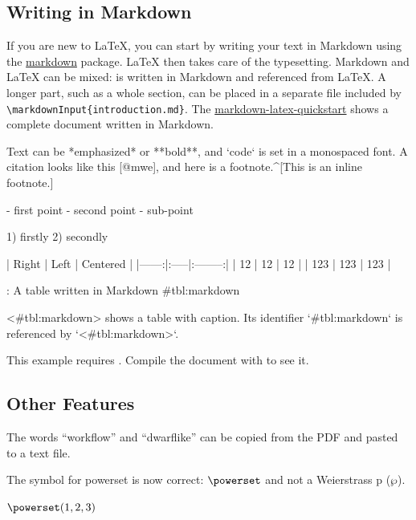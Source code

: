 \subsection{Writing in Markdown}\label{sec:markdown}

\ifluatex
  If you are new to \LaTeX{}, you can start by writing your text in Markdown using the \href{https://ctan.org/pkg/markdown}{markdown} package.
  \LaTeX{} then takes care of the typesetting.
  Markdown and \LaTeX{} can be mixed:
   is written in Markdown and referenced from \LaTeX{}.
  A longer part, such as a whole section, can be placed in a separate file included by \verb|\markdownInput{introduction.md}|.
  The \href{https://github.com/latextemplates/markdown-latex-quickstart}{markdown-latex-quickstart} shows a complete document written in Markdown.

  \begin{ltgexample}
  \begin{markdown}
Text can be *emphasized* or **bold**, and `code` is set in a monospaced font.
A citation looks like this [@mwe], and here is a footnote.^[This is an inline footnote.]

- first point
- second point
  - sub-point

1) firstly
2) secondly

| Right | Left | Centered |
|------:|:-----|:--------:|
|    12 | 12   |    12    |
|   123 | 123  |   123    |

: A table written in Markdown {#tbl:markdown}

<#tbl:markdown> shows a table with caption.
Its identifier `{#tbl:markdown}` is referenced by `<#tbl:markdown>`.
\end{markdown}
  \end{ltgexample}
\else
  This example requires .
  Compile the document with  to see it.
\fi

\subsection{Other Features}

\begin{ltgexample}
The words \enquote{workflow} and \enquote{dwarflike} can be copied from the PDF and pasted to a text file.
\end{ltgexample}

\begin{ltgexample}
The symbol for powerset is now correct: $\powerset$ and not a Weierstrass p ($\wp$).

$\powerset({1,2,3})$
\end{ltgexample}

